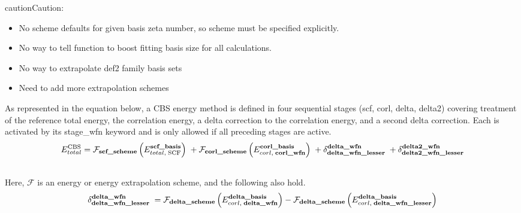 \documentclass[letterpaper,10pt,english]{sphinxmanual}
\begin{document}
\begin{fulllineitems}
\begin{notice}{caution}{Caution:}
\begin{itemize}
\item {} 
No scheme defaults for given basis zeta number, so scheme must be specified explicitly.

\item {} 
No way to tell function to boost fitting basis size for all calculations.

\item {} 
No way to extrapolate def2 family basis sets

\item {} 
Need to add more extrapolation schemes

\end{itemize}
\end{notice}

As represented in the equation below, a CBS energy method is defined in four
sequential stages (scf, corl, delta, delta2) covering treatment of the
reference total energy, the correlation energy, a delta correction to the
correlation energy, and a second delta correction. Each is activated by its
stage\_wfn keyword and is only allowed if all preceding stages are active.
\begin{gather}
\begin{split}E_{total}^{\text{CBS}} = \mathcal{F}_{\textbf{scf\_scheme}} \left(E_{total,\; \text{SCF}}^{\textbf{scf\_basis}}\right) \; + \mathcal{F}_{\textbf{corl\_scheme}} \left(E_{corl,\; \textbf{corl\_wfn}}^{\textbf{corl\_basis}}\right) \; + \delta_{\textbf{delta\_wfn\_lesser}}^{\textbf{delta\_wfn}} \; + \delta_{\textbf{delta2\_wfn\_lesser}}^{\textbf{delta2\_wfn}}\end{split}\notag\\\begin{split}\end{split}\notag
\end{gather}
Here, $\mathcal{F}$ is an energy or energy extrapolation scheme, and the following also hold.
\begin{gather}
\begin{split}\delta_{\textbf{delta\_wfn\_lesser}}^{\textbf{delta\_wfn}} \; = \mathcal{F}_{\textbf{delta\_scheme}} \left(E_{corl,\; \textbf{delta\_wfn}}^{\textbf{delta\_basis}}\right) - \mathcal{F}_{\textbf{delta\_scheme}} \left(E_{corl,\; \textbf{delta\_wfn\_lesser}}^{\textbf{delta\_basis}}\right)\end{split}\notag\\\begin{split}\end{split}\notag
\end{gather}\begin{gather}

\end{gather}
\end{fulllineitems}
\end{document}
